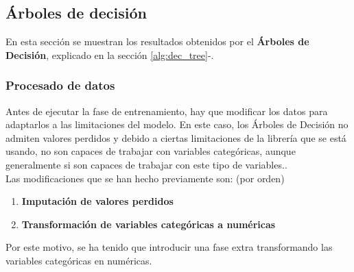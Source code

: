 \subsection{Árboles de decisión}
En esta sección se muestran los resultados obtenidos por el \textbf{Árboles de Decisión}, explicado en la sección \ref{alg:dec_tree}-.
\subsubsection*{Procesado de datos}
Antes de ejecutar la fase de entrenamiento, hay que modificar los datos para adaptarlos a las limitaciones del modelo. En este caso, los Árboles de Decisión no admiten valores perdidos y debido a ciertas limitaciones de la librería que se está usando, no son capaces de trabajar con variables categóricas, aunque generalmente si son capaces de trabajar con este tipo de variables..\\
Las modificaciones que se han hecho previamente son: (por orden)
\begin{enumerate}
	\item \textbf{Imputación de valores perdidos}
	\item \textbf{Transformación de variables categóricas a numéricas}
\end{enumerate}
Por este motivo, se ha tenido que introducir una fase extra transformando las variables categóricas en numéricas.
